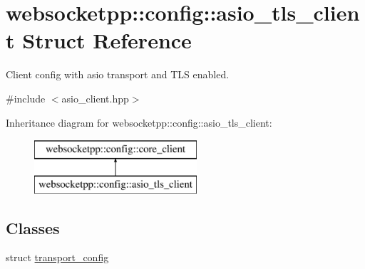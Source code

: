 \hypertarget{structwebsocketpp_1_1config_1_1asio__tls__client}{}\section{websocketpp\+:\+:config\+:\+:asio\+\_\+tls\+\_\+client Struct Reference}
\label{structwebsocketpp_1_1config_1_1asio__tls__client}


Client config with asio transport and T\+L\+S enabled.  




{\ttfamily \#include $<$asio\+\_\+client.\+hpp$>$}

Inheritance diagram for websocketpp\+:\+:config\+:\+:asio\+\_\+tls\+\_\+client\+:\begin{figure}[H]
\begin{center}
\leavevmode
\includegraphics[height=2.000000cm]{structwebsocketpp_1_1config_1_1asio__tls__client}
\end{center}
\end{figure}
\subsection*{Classes}
\begin{DoxyCompactItemize}
\item 
struct \hyperlink{structwebsocketpp_1_1config_1_1asio__tls__client_1_1transport__config}{transport\+\_\+config}
\end{DoxyCompactItemize}
